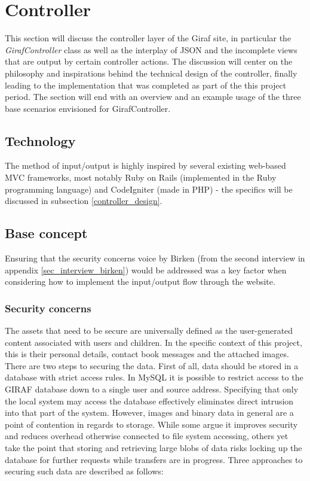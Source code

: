 \section{Controller}
\label{controller}
This section will discuss the controller layer of the Giraf site, in particular the \emph{GirafController} class as well as the interplay of JSON and the incomplete views that are output by certain controller actions. The discussion will center on the philosophy and inspirations behind the technical design of the controller, finally leading to the implementation that was completed as part of the this project period. The section will end with an overview and an example usage of the three base scenarios envisioned for GirafController.

\subsection{Technology}
The method of input/output is highly inspired by several existing web-based MVC frameworks, most notably Ruby on Rails (implemented in the Ruby programming language) and CodeIgniter (made in PHP) - the specifics will be discussed in subsection \vref{controller_design}.

\subsection{Base concept}
Ensuring that the security concerns voice by Birken (from the second interview in appendix \vref{sec_interview_birken}) would be addressed was a key factor when considering how to implement the input/output flow through the website.

\subsubsection*{Security concerns}
The assets that need to be secure are universally defined as the user-generated content associated with users and children. In the specific context of this project, this is their personal details, contact book messages and the attached images. There are two steps to securing the data. First of all, data should be stored in a database with strict access rules. In MySQL it is possible to restrict access to the GIRAF database down to a single user and source address. Specifying that only the local system may access the database effectively eliminates direct intrusion into that part of the system. However, images and binary data in general are a point of contention in regards to storage. While some argue it improves security and reduces overhead otherwise connected to file system accessing, others yet take the point that storing and retrieving large blobs of data risks locking up the database for further requests while transfers are in progress. Three approaches to securing such data are described as follows:

